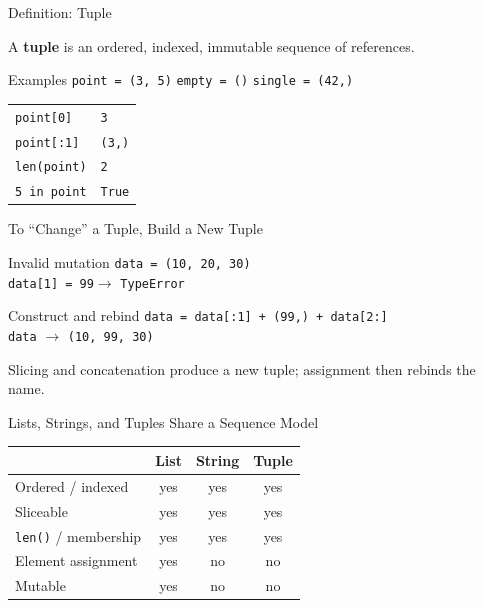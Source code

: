 \documentclass[aspectratio=169,10pt]{beamer}
\begin{document}
\begin{frame}{Definition: Tuple}
  \begin{cpdefinition}
    A \textbf{tuple} is an ordered, indexed, immutable sequence of references.
  \end{cpdefinition}

  \begin{block}{Examples}
    \texttt{point = (3, 5)}\qquad
    \texttt{empty = ()}\qquad
    \texttt{single = (42,)}
  \end{block}

  \begin{center}
    \renewcommand{\arraystretch}{1.2}
    \begin{tabular}{l|l}
      \texttt{point[0]} & \texttt{3} \\
      \texttt{point[:1]} & \texttt{(3,)} \\
      \texttt{len(point)} & \texttt{2} \\
      \texttt{5 in point} & \texttt{True}
    \end{tabular}
  \end{center}
\end{frame}

\begin{frame}{To ``Change'' a Tuple, Build a New Tuple}
  \begin{block}{Invalid mutation}
    \texttt{data = (10, 20, 30)}\\
    \texttt{data[1] = 99}\qquad $\rightarrow$ \quad \texttt{TypeError}
  \end{block}

  \begin{block}{Construct and rebind}
    \texttt{data = data[:1] + (99,) + data[2:]}\\
    \texttt{data} $\longrightarrow$ \texttt{(10, 99, 30)}
  \end{block}

  \begin{keyidea}
    Slicing and concatenation produce a new tuple; assignment then rebinds the name.
  \end{keyidea}
\end{frame}

\begin{frame}{Lists, Strings, and Tuples Share a Sequence Model}
  \begin{center}
    \renewcommand{\arraystretch}{1.3}
    \begin{tabular}{l|c|c|c}
      & \textbf{List} & \textbf{String} & \textbf{Tuple} \\\hline
      Ordered / indexed & yes & yes & yes \\
      Sliceable & yes & yes & yes \\
      \texttt{len()} / membership & yes & yes & yes \\
      Element assignment & yes & no & no \\
      Mutable & yes & no & no
    \end{tabular}
  \end{center}
\end{frame}
\end{document}
